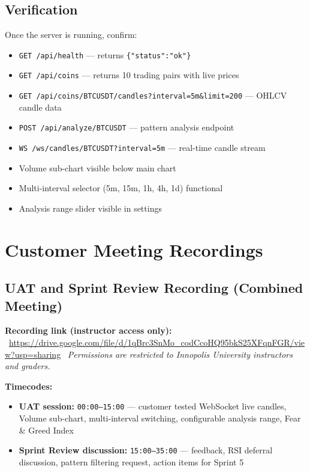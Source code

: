 \documentclass[11pt,a4paper]{article}
\begin{document}
\subsection{Verification}
Once the server is running, confirm:
\begin{itemize}
    \item \texttt{GET /api/health} --- returns \texttt{\{"status":"ok"\}}
    \item \texttt{GET /api/coins} --- returns 10 trading pairs with live prices
    \item \texttt{GET /api/coins/BTCUSDT/candles?interval=5m\&limit=200} --- OHLCV candle data
    \item \texttt{POST /api/analyze/BTCUSDT} --- pattern analysis endpoint
    \item \texttt{WS /ws/candles/BTCUSDT?interval=5m} --- real-time candle stream
    \item Volume sub-chart visible below main chart
    \item Multi-interval selector (5m, 15m, 1h, 4h, 1d) functional
    \item Analysis range slider visible in settings
\end{itemize}

\section{Customer Meeting Recordings}

\subsection{UAT and Sprint Review Recording (Combined Meeting)}
\textbf{Recording link (instructor access only):} \
\url{https://drive.google.com/file/d/1qBrc3SnMo_codCcoHQ95bkS25XFqnFGR/view?usp=sharing} \
\textit{Permissions are restricted to Innopolis University instructors and graders.}

\textbf{Timecodes:}
\begin{itemize}
    \item \textbf{UAT session:} \texttt{00:00--15:00} --- customer tested WebSocket live candles, Volume sub-chart, multi-interval switching, configurable analysis range, Fear \& Greed Index
    \item \textbf{Sprint Review discussion:} \texttt{15:00--35:00} --- feedback, RSI deferral discussion, pattern filtering request, action items for Sprint 5
\end{itemize}
\end{document}
